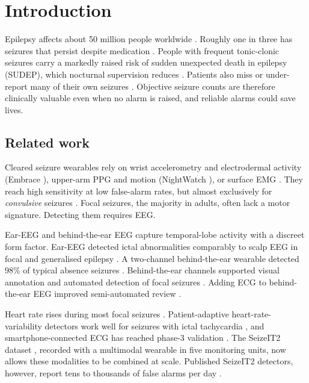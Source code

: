 \section{Introduction}
\label{sec:intro}

Epilepsy affects about 50 million people worldwide \cite{who}. Roughly one in three has seizures that persist despite medication \cite{kwan2000}. People with frequent tonic-clonic seizures carry a markedly raised risk of sudden unexpected death in epilepsy (SUDEP), which nocturnal supervision reduces \cite{sudep,ryvlin2013}. Patients also miss or under-report many of their own seizures \cite{hoppe2007,elger2018}. Objective seizure counts are therefore clinically valuable even when no alarm is raised, and reliable alarms could save lives.

\subsection{Related work}

Cleared seizure wearables rely on wrist accelerometry and electrodermal activity (Embrace \cite{onorati2017}), upper-arm PPG and motion (NightWatch \cite{arends2018}), or surface EMG \cite{beniczky2018}. They reach high sensitivity at low false-alarm rates, but almost exclusively for \emph{convulsive} seizures \cite{beniczky2021}. Focal seizures, the majority in adults, often lack a motor signature. Detecting them requires EEG.

Ear-EEG and behind-the-ear EEG capture temporal-lobe activity with a discreet form factor. Ear-EEG detected ictal abnormalities comparably to scalp EEG in focal and generalised epilepsy \cite{zibrandtsen2017}. A two-channel behind-the-ear wearable detected 98\% of typical absence seizures \cite{swinnen2021}. Behind-the-ear channels supported visual annotation and automated detection of focal seizures \cite{vandecasteele2020}. Adding ECG to behind-the-ear EEG improved semi-automated review \cite{bhagubai2023}.

Heart rate rises during most focal seizures \cite{jeppesen2019,jeppesen2024}. Patient-adaptive heart-rate-variability detectors work well for seizures with ictal tachycardia \cite{jeppesen2024}, and smartphone-connected ECG has reached phase-3 validation \cite{phase3ecg2025}. The SeizeIT2 dataset \cite{bhagubai2025}, recorded with a multimodal wearable in five monitoring units, now allows these modalities to be combined at scale. Published SeizeIT2 detectors, however, report tens to thousands of false alarms per day \cite{bhagubai2025,reintjes2025}.

